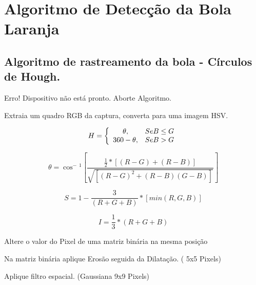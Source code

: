 \chapter{Algoritmo de Detecção da Bola Laranja} 
\label{chap:apendiceBolaLaranja}
\section{Algoritmo de rastreamento da bola - Círculos de Hough.}

\begin{algorithm}

	{Erro! Dispositivo não está pronto.
	Aborte Algoritmo.
		}

{

Extraia um quadro RGB da captura, converta para uma imagem HSV.

\begin{equation}
     \centering
    	H = \left\{
		\begin{array}
		{ccl} 
		$$\theta, 	& Se B  \leq  G $$\\
		$$360 - \theta,	& Se B  >  G $$
		\end{array} 
\right.
\end{equation}

\begin{equation}
	\theta  =  \cos^-{^1} \left[  {   \frac {  \frac {1} {2} * [(R -G) + (R-B)]}  {  \sqrt{[(R -G)^2 + (R -B)(G -B)]}   }    }\right]
\end{equation}

\begin{equation}
	S  =  1 - { \frac {3} {(R+G+B)} } * [min (R,G,B)]
\end{equation}

\begin{equation}
	I  =  { \frac {1} {3}} * {(R+G+B)}
\end{equation}




	{Altere o valor do Pixel de uma matriz binária na mesma posição}

Na matriz binária aplique Erosão seguida da Dilatação. ( 5x5 Pixels)

Aplique filtro espacial. (Gaussiana 9x9 Pixels)

}
\end{algorithm}

